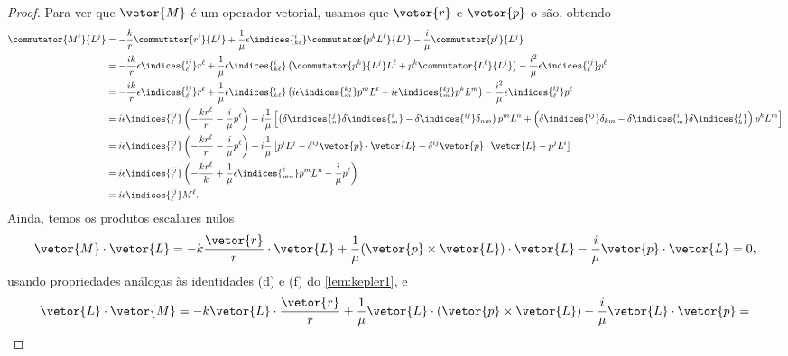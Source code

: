 \begin{proof}
   Para ver que \(\vetor{M}\) é um operador vetorial, usamos que \(\vetor{r}\) e \(\vetor{p}\) o são, obtendo
   \begin{align*}
      \commutator{M^i}{L^j} &= -\frac{k}{r} \commutator{r^i}{L^j} + \frac{1}{\mu} \epsilon\indices{^i_{k\ell}}\commutator{p^k L^\ell}{L^j} - \frac{i}{\mu} \commutator{p^i}{L^j}\\
                            &= -\frac{ik}{r} \epsilon\indices{^{i j}_\ell} r^\ell + \frac{1}{\mu} \epsilon\indices{^i_{k \ell}}\left(\commutator{p^k}{L^j} L^\ell + p^k \commutator{L^\ell}{L^j}\right) - \frac{i^2}{\mu} \epsilon\indices{^{ij}_\ell} p^\ell\\
                            &= -\frac{ik}{r} \epsilon\indices{^{i j}_\ell} r^\ell + \frac{1}{\mu} \epsilon\indices{^i_{k \ell}}\left(i \epsilon\indices{^{k j}_m} p^m L^\ell + i \epsilon\indices{^{\ell j}_m}p^k L^m\right) - \frac{i^2}{\mu} \epsilon\indices{^{ij}_\ell} p^\ell\\
                            &= i\epsilon\indices{^{ij}_\ell}\left(-\frac{kr^\ell}{r} - \frac{i}{\mu}p^\ell\right) + i\frac{1}{\mu} \left[\left(\delta\indices{^j_n}\delta\indices{^i_m} - \delta\indices{^{ij}}\delta_{nm}\right)p^m L^n + \left(\delta\indices{^{ij}}\delta_{km} - \delta\indices{^i_m}\delta\indices{^j_k}\right)p^k L^m\right]\\
                            &= i \epsilon\indices{^{ij}_\ell} \left(-\frac{kr^\ell}{r} - \frac{i}{\mu}p^\ell\right) + i \frac{1}{\mu} \left[p^i L^j - \delta^{ij} \vetor{p}\cdot\vetor{L} + \delta^{ij} \vetor{p} \cdot\vetor{L} - p^j L^i\right]\\
                            &= i \epsilon\indices{^{ij}_\ell} \left(-\frac{k r^\ell}{k} + \frac{1}{\mu}\epsilon\indices{^\ell_{mn}} p^m L^n - \frac{i}{\mu} p^\ell\right)\\
                            &= i \epsilon\indices{^{ij}_\ell} M^\ell.
   \end{align*}
   Ainda, temos os produtos escalares nulos
   \begin{equation*}
      \vetor{M} \cdot \vetor{L} = - k\frac{\vetor{r}}{r} \cdot \vetor{L} + \frac1\mu (\vetor{p}\times\vetor{L}) \cdot \vetor{L} - \frac{i}{\mu} \vetor{p} \cdot \vetor{L} = 0,
   \end{equation*}
   usando propriedades análogas às identidades (d) e (f) do \cref{lem:kepler1}, e
   \begin{equation*}
      \vetor{L} \cdot \vetor{M} = - k\vetor{L} \cdot \frac{\vetor{r}}{r}+ \frac1\mu \vetor{L} \cdot (\vetor{p}\times\vetor{L}) - \frac{i}{\mu} \vetor{L} \cdot \vetor{p} = 
   \end{equation*}
\end{proof}
